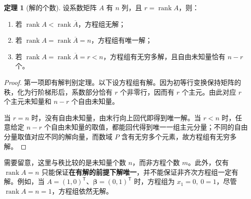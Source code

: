 \documentclass[UTF8, fontset=fandol, a4paper, 12pt]{ctexart}
\newcommand{\rank}{\operatorname{rank}}
\newcommand{\vb}{\boldsymbol{\beta}}
\theoremstyle{definition}
\newtheorem{theorem}[definition]{定理}
\begin{document}
\begin{theorem}[解的个数]
设系数矩阵 $A$ 有 $n$ 列，且 $r=\rank A$，则：
\begin{enumerate}
 \item 若 $\rank A<\rank\overline A$，方程组无解；
 \item 若 $\rank A=\rank\overline A=n$，方程组有唯一解；
 \item 若 $\rank A=\rank\overline A=r<n$，方程组有无穷多解，且自由未知量恰有 $n-r$ 个。
\end{enumerate}
\end{theorem}
\begin{proof}
第一项即有解判别定理。以下设方程组有解。因为初等行变换保持矩阵的秩，化为行阶梯形后，系数部分恰有 $r$ 个非零行，因而有 $r$ 个主元。由此对应 $r$ 个主元未知量和 $n-r$ 个自由未知量。

当 $r=n$ 时，没有自由未知量，由末行向上回代即得到唯一解。当 $r<n$ 时，任意给定 $n-r$ 个自由未知量的取值，都能回代得到唯一一组主元分量；不同的自由分量取值对应不同的解向量，而数域 $P$ 含有无穷多个元素，故方程组有无穷多解。
\end{proof}

需要留意，这里与秩比较的是未知量个数 $n$，而非方程个数 $m$。此外，仅有 $\rank A=n$ 只能保证\textbf{在有解的前提下解唯一}，并不能保证非齐次方程组一定有解。例如，当 $A=(1,0)^{\mathsf T}$、$\vb=(0,1)^{\mathsf T}$ 时，方程组为 $x_1=0,\ 0=1$，尽管 $\rank A=n=1$，方程组依然无解。
\end{document}
